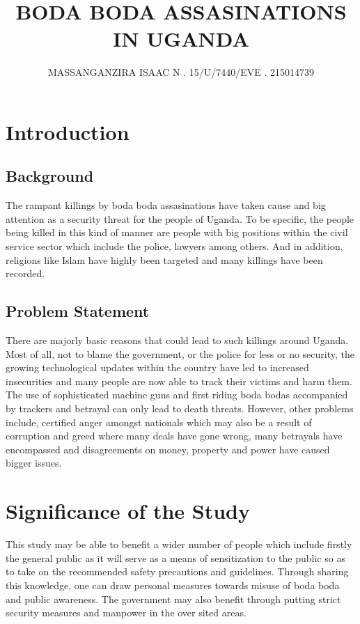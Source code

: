 \documentclass{article}
\begin{document}
\title {BODA BODA ASSASINATIONS IN UGANDA}
\author{MASSANGANZIRA ISAAC N  . 15/U/7440/EVE . 215014739}
\maketitle
\section{Introduction}
\subsection{Background}
The rampant killings by boda boda assasinations have taken cause and big attention
as a security threat for the people of Uganda. To be specific, the people being killed 
in this kind of manner are people with big positions within the civil service sector which
include the police, lawyers among others. And in addition, religions like Islam have
highly been targeted and many killings have been recorded.

\subsection{ Problem Statement}
There are majorly basic reasons that could lead to such killings around Uganda. Most
of all, not to blame the government, or the police for less or no security, the growing 
technological updates within the country have led to increased insecurities and many
people are now able to track their victims and harm them. The use of sophisticated
machine guns and first riding boda bodas accompanied by trackers and betrayal can 
only lead to death threats.
However, other problems include, certified anger amongst nationals which may also be
a result of corruption and greed where many deals have gone wrong, many betrayals
have encompassed and disagreements on money, property and power have caused 
bigger issues.


\section{Significance of the Study}
This study may be able to benefit a wider number of people which include firstly the 
general public as it will serve as a means of sensitization to the public so as to take 
on the recommended safety precautions and guidelines. Through sharing this knowledge,
one can draw personal measures towards misuse of boda boda and public awareness.
The government may also benefit through putting strict security measures and manpower
in the over sited areas.
\end{document}
